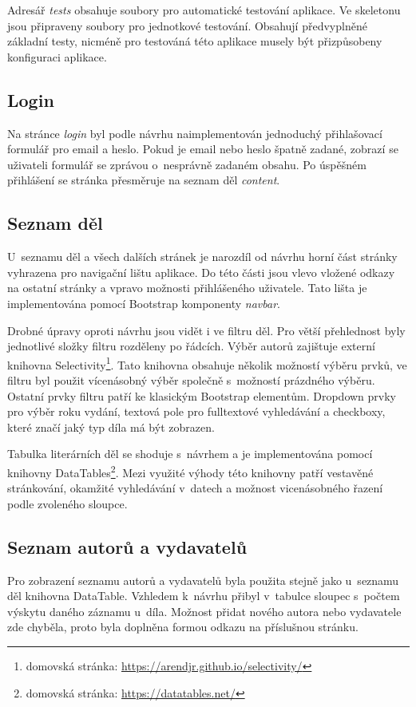              Adresář \textit{tests} obsahuje soubory pro automatické testování aplikace. Ve skeletonu jsou připraveny soubory pro jednotkové testování. Obsahují předvyplněné základní testy, nicméně pro testováná této aplikace musely být přizpůsobeny konfiguraci aplikace.
             
        \subsection{Login}
            Na stránce \textit{login} byl podle návrhu naimplementován jednoduchý přihlašovací formulář pro email a heslo. Pokud je email nebo heslo špatně zadané, zobrazí se uživateli formulář se zprávou o~nesprávně zadaném obsahu. Po úspěšném přihlášení se stránka přesměruje na seznam děl \textit{content}.
            
        \subsection{Seznam děl}
            U~seznamu děl a všech dalších stránek je narozdíl od návrhu horní část stránky vyhrazena pro navigační lištu aplikace. Do této části jsou vlevo vložené odkazy na ostatní stránky a vpravo možnosti přihlášeného uživatele. Tato lišta je implementována pomocí Bootstrap komponenty \textit{navbar}. 
            
            Drobné úpravy oproti návrhu jsou vidět i ve filtru děl. Pro větší přehlednost byly jednotlivé složky filtru rozděleny po řádcích. Výběr autorů zajištuje externí knihovna Selectivity\footnote{domovská stránka: \url{https://arendjr.github.io/selectivity/}}. Tato knihovna obsahuje několik možností výběru prvků, ve filtru byl použit vícenásobný výběr společně s~možností prázdného výběru. Ostatní prvky filtru patří ke klasickým Bootstrap elementům. Dropdown prvky pro výběr roku vydání, textová pole pro fulltextové vyhledávání a checkboxy, které značí jaký typ díla má být zobrazen.
            
            Tabulka literárních děl se shoduje s~návrhem a je implementována pomocí knihovny DataTables\footnote{domovská stránka: \url{https://datatables.net/}}. Mezi využité  výhody této knihovny patří vestavěné stránkování, okamžité vyhledávání v~datech a možnost vicenásobného řazení podle zvoleného sloupce.
            
        \subsection{Seznam autorů a vydavatelů}
            Pro zobrazení seznamu autorů a vydavatelů byla použita stejně jako u~seznamu děl knihovna DataTable. Vzhledem k~návrhu přibyl v~tabulce sloupec s~počtem výskytu daného záznamu u~díla. Možnost přidat nového autora nebo vydavatele zde chyběla, proto byla doplněna formou odkazu na příslušnou stránku.
        
